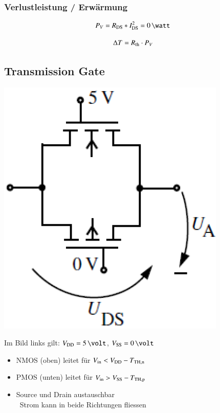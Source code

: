 \subsubsection{Verlustleistung / Erwärmung}

\begin{minipage}[c]{0.48\columnwidth}
    $$ P_V = R_{\rm DS} * I_{\rm DS}^2 = 0 \, \watt $$
\end{minipage}
\hfill
\begin{minipage}[c]{0.48\columnwidth}
    $$ \Delta T = R_{\rm th} \cdot P_V $$
\end{minipage}


\subsection{Transmission Gate}

\begin{minipage}[c]{0.22\columnwidth}
    \includegraphics[width=\columnwidth]{images/transmission_gate.png}
\end{minipage}
\hfill
\begin{minipage}[c]{0.68\columnwidth}
    Im Bild links gilt: $V_{\rm DD} = 5 \, \volt$, $V_{\rm SS} = 0 \, \volt$ 

    \begin{itemize}
        \item NMOS (oben) leitet für $V_{\rm in} < V_{\rm DD} - T_{\rm TH,n}$
        \item PMOS (unten) leitet für $V_{\rm in} > V_{\rm SS} - T_{\rm TH,p}$
        \item Source und Drain austauschbar \\
            \textrightarrow\ Strom kann in beide Richtungen fliessen
    \end{itemize}
\end{minipage}